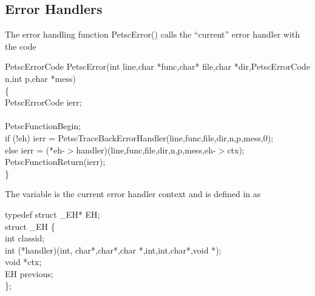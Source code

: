 \documentclass[twoside,12pt]{../sty/report_petsc}
\begin{document}
\subsection{Error Handlers}
The error handling function PetscError() calls the ``current'' error handler
with the code
\begin{tabbing}
PetscErrorCode PetscError(int line,char *func,char* file,char *dir,PetscErrorCode n,int p,char *mess)\\
\{ \\
  PetscErrorCode ierr;\\
\\
  PetscFunctionBegin;\\
  if (!eh)     ierr = PetscTraceBackErrorHandler(line,func,file,dir,n,p,mess,0);\\
  else         ierr = (*eh-$>$handler)(line,func,file,dir,n,p,mess,eh-$>$ctx);\\
  PetscFunctionReturn(ierr);\\
\}
\end{tabbing}
The variable  is the current error handler context and is defined in 
 as
\begin{tabbing}
typedef struct \_EH* EH;\\
struct \_EH \{\\
  int    classid;\\
  int    (*handler)(int, char*,char*,char *,int,int,char*,void *);\\
  void   *ctx;\\
  EH     previous;\\
\};
\end{tabbing}
\end{document}
